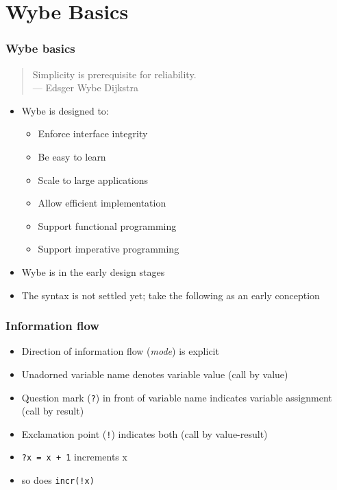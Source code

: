 \documentclass[12pt]{beamer}
\begin{document}
\section{Wybe Basics}

\begin{frame}
\frametitle{Wybe basics}
\begin{quotation}
Simplicity is prerequisite for reliability. \\
\hspace*{3em}--- Edsger Wybe Dijkstra
\end{quotation}

\begin{itemize}
\item Wybe is designed to:
  \begin{itemize}
  \item Enforce interface integrity
  \item Be easy to learn
  \item Scale to large applications
  \item Allow efficient implementation
  \item Support functional programming
  \item Support imperative programming
  \end{itemize}
\item Wybe is in the early design stages
\item The syntax is not settled yet; take the following as an early conception
\end{itemize}
\end{frame}


\begin{frame}
\frametitle{Information flow}
\begin{itemize}
\item Direction of information flow (\emph{mode}) is explicit
\item Unadorned variable name denotes variable value (call by value)
\item Question mark (\texttt{?}) in front of variable name indicates
  variable assignment (call by result)
\item Exclamation point (\texttt{!}) indicates both (call by value-result)
\item \texttt{?x = x + 1} increments x
\item so does \texttt{incr(!x)}
\end{itemize}
\end{frame}
\end{document}
